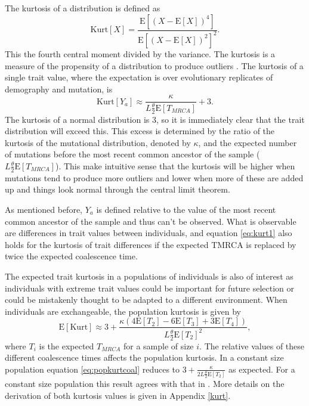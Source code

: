 \documentclass{article}
\newcommand{\T}{\frac{\theta}{2}}
\newcommand{\E}{\mathrm{E}}
\begin{document}
The kurtosis of a distribution is defined as
\begin{equation*}
  \mbox{Kurt}[X]=\frac{\E[(X-\E[X])^4]}{\E[(X-\E[X])^2]^2}.
\end{equation*}
This the fourth central moment divided by the variance. The kurtosis is a
measure of the propensity of a distribution to produce outliers
\citep{Westfall2014}. The kurtosis of a single trait value, where the
expectation is over evolutionary replicates of demography and mutation, is 
\begin{equation}
  \label{eq:kurt1}
  \mbox{Kurt}[Y_a] \approx \frac{\kappa}{L\T \E[T_{MRCA}]} + 3.
\end{equation}
The kurtosis of a normal distribution is $3$, so it is immediately clear that
the trait distribution will exceed this. This excess is determined by the ratio
of the kurtosis of the mutational distribution, denoted by $\kappa$, and the
expected number of mutations before the most recent common ancestor of the
sample ($L\T \E[T_{MRCA}]$). This make intuitive sense that the kurtosis will be
higher when mutations tend to produce more outliers and lower when more of these
are added up and things look normal through the central limit theorem. 

As mentioned before, $Y_a$ is defined relative to the value of the most recent
common ancestor of the sample and thus can't be observed. What is observable are
differences in trait values between individuals, and equation \eqref{eq:kurt1}
also holds for the kurtosis of trait differences if the expected TMRCA is
replaced by twice the expected coalescence time. 

The expected trait kurtosis in a populations of individuals is also of interest
as individuals with extreme trait values could be important for future selection
or could be mistakenly thought to be adapted to a different environment. When
individuals are exchangeable, the population kurtosis is given by
\begin{equation}
  \label{eq:popkurtcoal}
  \E[\mbox{Kurt}] \approx 3 + \frac{\kappa( 4\E[T_2] - 6\E[T_3] + 
    3\E[T_4])}{L \T \E[T_2]^2},
\end{equation}
where $T_i$ is the expected $T_{MRCA}$ for a sample of size $i$. The relative
values of these different coalescence times affects the population kurtosis. In
a constant size population equation \eqref{eq:popkurtcoal} reduces to $3 +
\frac{\kappa}{2L\T \E[T_2]}$ as expected. For a constant size population this
result agrees with that in \citet{Schraiber2015}. More details on the derivation
of both kurtosis values is given in Appendix \ref{kurt}.
\end{document}

